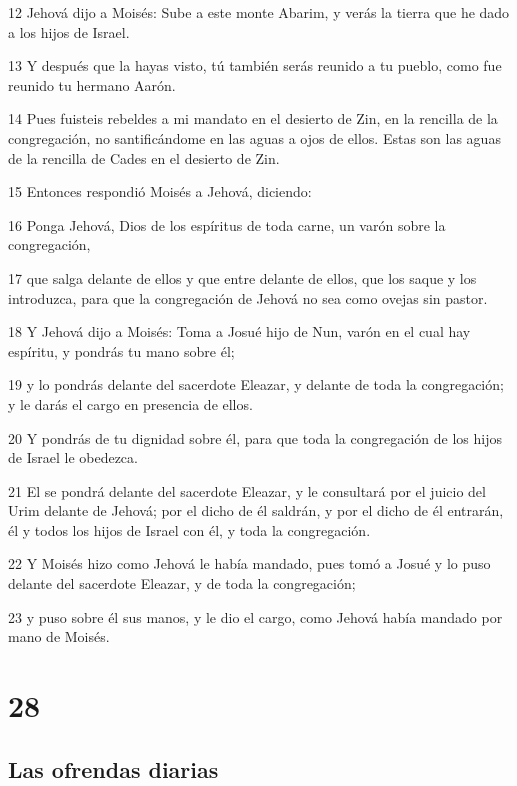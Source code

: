 \par 12 Jehová dijo a Moisés: Sube a este monte Abarim, y verás la tierra que he dado a los hijos de Israel.
\par 13 Y después que la hayas visto, tú también serás reunido a tu pueblo, como fue reunido tu hermano Aarón.
\par 14 Pues fuisteis rebeldes a mi mandato en el desierto de Zin, en la rencilla de la congregación, no santificándome en las aguas a ojos de ellos. Estas son las aguas de la rencilla de Cades en el desierto de Zin.
\par 15 Entonces respondió Moisés a Jehová, diciendo:
\par 16 Ponga Jehová, Dios de los espíritus de toda carne, un varón sobre la congregación,
\par 17 que salga delante de ellos y que entre delante de ellos, que los saque y los introduzca, para que la congregación de Jehová no sea como ovejas sin pastor.
\par 18 Y Jehová dijo a Moisés: Toma a Josué hijo de Nun, varón en el cual hay espíritu, y pondrás tu mano sobre él;
\par 19 y lo pondrás delante del sacerdote Eleazar, y delante de toda la congregación; y le darás el cargo en presencia de ellos.
\par 20 Y pondrás de tu dignidad sobre él, para que toda la congregación de los hijos de Israel le obedezca.
\par 21 El se pondrá delante del sacerdote Eleazar, y le consultará por el juicio del Urim  delante de Jehová; por el dicho de él saldrán, y por el dicho de él entrarán, él y todos los hijos de Israel con él, y toda la congregación.
\par 22 Y Moisés hizo como Jehová le había mandado, pues tomó a Josué y lo puso delante del sacerdote Eleazar, y de toda la congregación;
\par 23 y puso sobre él sus manos, y le dio el cargo, como Jehová había mandado por mano de Moisés.

\chapter{28}

\section*{Las ofrendas diarias}

